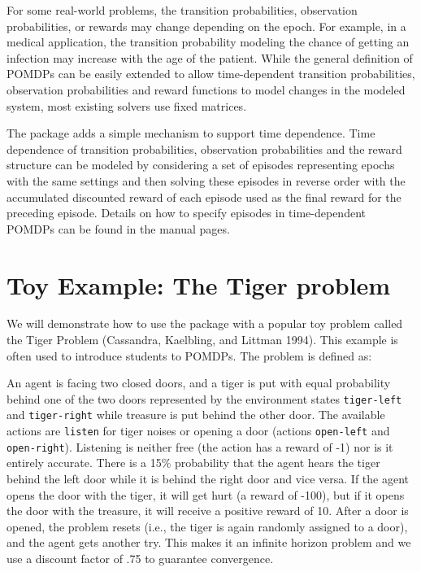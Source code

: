 For some real-world problems, the transition probabilities, observation probabilities, or
rewards may change depending on the epoch. For example, in a medical application, the
transition probability modeling the chance of getting an infection may increase with
the age of the patient.
While the general definition of POMDPs can be easily extended to allow time-dependent transition probabilities, observation
probabilities and reward functions to model changes in the modeled system,
most existing solvers use fixed matrices.

The package  adds a simple mechanism to support time dependence.
Time dependence of transition probabilities, observation probabilities and the reward structure can be modeled by considering a set of episodes representing epochs with the same settings and then solving these
episodes in reverse order with the accumulated discounted reward of each episode used as the final reward for the preceding episode.
Details on how to specify episodes in time-dependent POMDPs can be found in the  manual pages.

\hypertarget{toy-example-the-tiger-problem}{%
\section{Toy Example: The Tiger problem}\label{toy-example-the-tiger-problem}}

We will demonstrate how to use the package with a popular toy problem called the Tiger Problem (Cassandra, Kaelbling, and Littman 1994).
This example is often used to introduce students to POMDPs.
The problem is defined as:

An agent is facing two closed doors, and a tiger is put with equal
probability behind one of the two doors represented by the environment states
\texttt{tiger-left} and \texttt{tiger-right} while treasure is put behind the other
door. The available actions are \texttt{listen} for tiger noises or opening a
door (actions \texttt{open-left} and \texttt{open-right}).
Listening is neither free
(the action has a reward of -1) nor is it entirely accurate. There is
a 15\% probability that the agent hears the tiger behind the left door
while it is behind the right door and vice versa. If the
agent opens the door with the tiger, it will get hurt (a reward
of -100), but if it opens the door with the treasure, it will receive
a positive reward of 10. After a door is opened, the problem
resets (i.e., the tiger is again randomly assigned to a door), and the agent gets another try.
This makes it an infinite horizon problem and we use a discount factor
of .75 to guarantee convergence.

